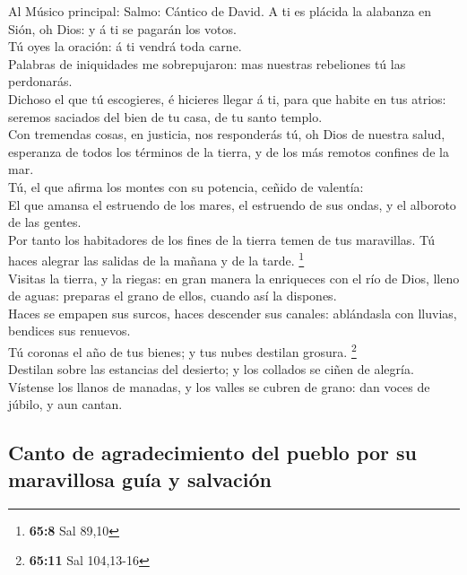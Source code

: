  Al Músico principal: Salmo: Cántico de David. A ti es
plácida la alabanza en Sión, oh Dios: y á ti se pagarán los votos.\\
 Tú oyes la oración: á ti vendrá toda carne.\\
 Palabras de iniquidades me sobrepujaron: mas nuestras
rebeliones tú las perdonarás.\\
 Dichoso el que tú escogieres, é hicieres llegar á ti,
para que habite en tus atrios: seremos saciados del bien de tu casa, de
tu santo templo.\\
 Con tremendas cosas, en justicia, nos responderás tú, oh
Dios de nuestra salud, esperanza de todos los términos de la tierra, y
de los más remotos confines de la mar.\\
 Tú, el que afirma los montes con su potencia, ceñido de
valentía:\\
 El que amansa el estruendo de los mares, el estruendo de
sus ondas, y el alboroto de las gentes.\\
 Por tanto los habitadores de los fines de la tierra temen
de tus maravillas. Tú haces alegrar las salidas de la mañana y de la
tarde. \footnote{\textbf{65:8} Sal 89,10}\\
 Visitas la tierra, y la riegas: en gran manera la
enriqueces con el río de Dios, lleno de aguas: preparas el grano de
ellos, cuando así la dispones.\\
 Haces se empapen sus surcos, haces descender sus
canales: ablándasla con lluvias, bendices sus renuevos.\\
 Tú coronas el año de tus bienes; y tus nubes destilan
grosura. \footnote{\textbf{65:11} Sal 104,13-16}\\
 Destilan sobre las estancias del desierto; y los
collados se ciñen de alegría.\\
 Vístense los llanos de manadas, y los valles se cubren
de grano: dan voces de júbilo, y aun cantan.

\hypertarget{canto-de-agradecimiento-del-pueblo-por-su-maravillosa-guuxeda-y-salvaciuxf3n}{%
\subsection{Canto de agradecimiento del pueblo por su maravillosa guía y
salvación}\label{canto-de-agradecimiento-del-pueblo-por-su-maravillosa-guuxeda-y-salvaciuxf3n}}

